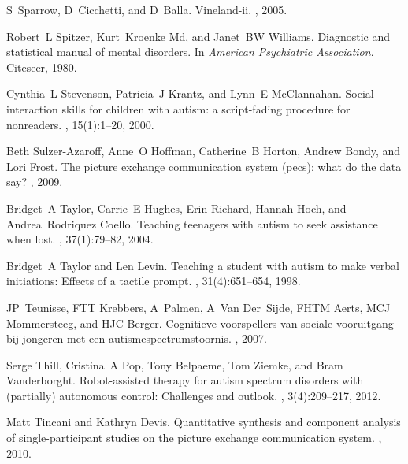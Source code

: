 \documentclass{ut-thesis}
\begin{document}
\begin{thebibliography}{100}
S~Sparrow, D~Cicchetti, and D~Balla.
\newblock Vineland-ii.
, 2005.

Robert~L Spitzer, Kurt~Kroenke Md, and Janet~BW Williams.
\newblock Diagnostic and statistical manual of mental disorders.
\newblock In {\em American Psychiatric Association}. Citeseer, 1980.

Cynthia~L Stevenson, Patricia~J Krantz, and Lynn~E McClannahan.
\newblock Social interaction skills for children with autism: a script-fading
  procedure for nonreaders.
, 15(1):1--20, 2000.

Beth Sulzer-Azaroff, Anne~O Hoffman, Catherine~B Horton, Andrew Bondy, and Lori
  Frost.
\newblock The picture exchange communication system (pecs): what do the data
  say?
, 2009.

Bridget~A Taylor, Carrie~E Hughes, Erin Richard, Hannah Hoch, and
  Andrea~Rodriquez Coello.
\newblock Teaching teenagers with autism to seek assistance when lost.
, 37(1):79--82, 2004.

Bridget~A Taylor and Len Levin.
\newblock Teaching a student with autism to make verbal initiations: Effects of
  a tactile prompt.
, 31(4):651--654, 1998.

JP~Teunisse, FTT Krebbers, A~Palmen, A~Van Der~Sijde, FHTM Aerts, MCJ
  Mommersteeg, and HJC Berger.
\newblock Cognitieve voorspellers van sociale vooruitgang bij jongeren met een
  autismespectrumstoornis.
, 2007.

Serge Thill, Cristina~A Pop, Tony Belpaeme, Tom Ziemke, and Bram Vanderborght.
\newblock Robot-assisted therapy for autism spectrum disorders with (partially)
  autonomous control: Challenges and outlook.
, 3(4):209--217, 2012.

Matt Tincani and Kathryn Devis.
\newblock Quantitative synthesis and component analysis of single-participant
  studies on the picture exchange communication system.
, 2010.


\end{thebibliography}
\end{document}
